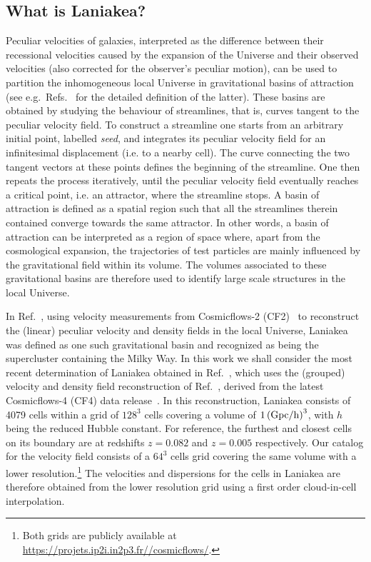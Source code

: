 \documentclass[notitlepage,nofootinbib]{revtex4-1}
\begin{document}
\subsection{What is Laniakea?}
Peculiar velocities of galaxies, interpreted as the difference between their recessional velocities caused by the expansion of the Universe and their observed velocities (also corrected for the observer's peculiar motion), can be used to partition the inhomogeneous local Universe in gravitational basins of attraction (see e.g.\ Refs.~\cite{Dupuy:2019blz} for the detailed definition of the latter). These basins are obtained by studying the behaviour of streamlines, that is, curves tangent to the peculiar velocity field. To construct a streamline one starts from an arbitrary initial point, labelled \textit{seed}, and integrates its peculiar velocity field for an infinitesimal displacement (i.e. to a nearby cell). The curve connecting the two tangent vectors at these points defines the beginning of the streamline. One then repeats the process iteratively, until the peculiar velocity field 
eventually reaches a critical point, i.e. an attractor, where the streamline stops. A basin of attraction is defined as a spatial region such that all the streamlines therein contained converge towards the same attractor. In other words, a basin of attraction can be interpreted as a region of space where, apart from the cosmological expansion, the trajectories of test particles are mainly influenced by the gravitational field within its volume. The volumes associated to these gravitational basins are therefore used to identify large scale structures in the local Universe.

In Ref.~\cite{Tully:2014gfa}, using velocity measurements from Cosmicflows-2 (CF2)~\cite{Tully:2013wqa} to reconstruct the (linear) peculiar velocity and density fields in the local Universe, Laniakea was defined as one such gravitational basin and recognized as being the supercluster containing the Milky Way.  In this work we shall consider the most recent determination of Laniakea obtained in Ref.~\cite{Dupuy:2023ffz}, which uses the (grouped) velocity and density field reconstruction of Ref.~\cite{Courtois:2022mxo}, derived from the latest Cosmicflows-4 (CF4) data release~\cite{Tully:2022rbj}. In this reconstruction, Laniakea consists of 4079 cells within a grid of $128^3$ cells covering a volume of $1 \left(\rm{Gpc}/h\right)^3$, with $h$ being the reduced Hubble constant. For reference, the furthest and closest cells on its boundary are at redshifts $z=0.082$ and $z=0.005$ respectively. Our catalog for the velocity field consists of a $64^3$ cells grid covering the same volume with a lower resolution.\footnote{Both grids are publicly available at \href{https://projets.ip2i.in2p3.fr//cosmicflows/}{https://projets.ip2i.in2p3.fr//cosmicflows/}.} The velocities and dispersions for the cells in Laniakea are therefore obtained from the lower resolution grid using a first order cloud-in-cell interpolation. 
\end{document}
